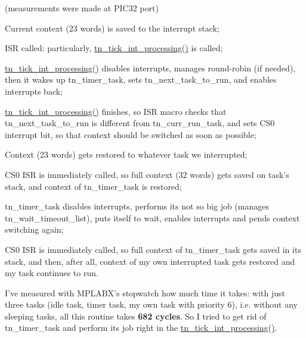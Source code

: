 (measurements were made at P\+I\+C32 port)


\begin{DoxyItemize}
\item Current context (23 words) is saved to the interrupt stack;
\item I\+S\+R called\+: particularly, {\ttfamily \hyperlink{tn__sys_8h_a944d96c7a5d442d271115b6cb22a085b}{tn\+\_\+tick\+\_\+int\+\_\+processing()}} is called;
\item {\ttfamily \hyperlink{tn__sys_8h_a944d96c7a5d442d271115b6cb22a085b}{tn\+\_\+tick\+\_\+int\+\_\+processing()}} disables interrupts, manages round-\/robin (if needed), then it wakes up {\ttfamily tn\+\_\+timer\+\_\+task}, sets {\ttfamily tn\+\_\+next\+\_\+task\+\_\+to\+\_\+run}, and enables interrupts back;
\item {\ttfamily \hyperlink{tn__sys_8h_a944d96c7a5d442d271115b6cb22a085b}{tn\+\_\+tick\+\_\+int\+\_\+processing()}} finishes, so I\+S\+R macro checks that {\ttfamily tn\+\_\+next\+\_\+task\+\_\+to\+\_\+run} is different from {\ttfamily tn\+\_\+curr\+\_\+run\+\_\+task}, and sets {\ttfamily C\+S0} interrupt bit, so that context should be switched as soon as possible;
\item Context (23 words) gets restored to whatever task we interrupted;
\item {\ttfamily C\+S0} I\+S\+R is immediately called, so full context (32 words) gets saved on task's stack, and context of {\ttfamily tn\+\_\+timer\+\_\+task} is restored;
\item {\ttfamily tn\+\_\+timer\+\_\+task} disables interrupts, performs its not so big job (manages {\ttfamily tn\+\_\+wait\+\_\+timeout\+\_\+list}), puts itself to wait, enables interrupts and pends context switching again;
\item {\ttfamily C\+S0} I\+S\+R is immediately called, so full context of {\ttfamily tn\+\_\+timer\+\_\+task} gets saved in its stack, and then, after all, context of my own interrupted task gets restored and my task continues to run.
\end{DoxyItemize}

I've measured with M\+P\+L\+A\+B\+X's stopwatch how much time it takes\+: with just three tasks (idle task, timer task, my own task with priority 6), i.\+e. without any sleeping tasks, all this routine takes {\bfseries 682 cycles}. So I tried to get rid of {\ttfamily tn\+\_\+timer\+\_\+task} and perform its job right in the {\ttfamily \hyperlink{tn__sys_8h_a944d96c7a5d442d271115b6cb22a085b}{tn\+\_\+tick\+\_\+int\+\_\+processing()}}.

